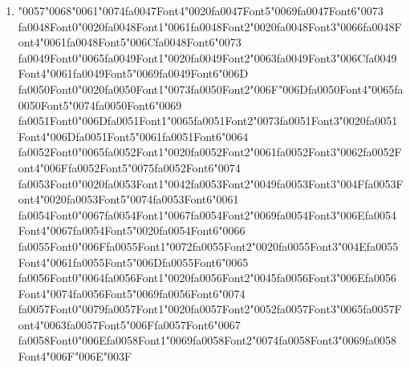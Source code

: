 \documentclass[11pt]{article}
\begin{document}
\begin{enumerate}[leftmargin=*]
  \item {\char"0057}{\char"0068}{\char"0061}{\char"0074}{\csname fa0047Font4\endcsname\char"0020}{\csname fa0047Font5\endcsname\char"0069}{\csname fa0047Font6\endcsname\char"0073} {\csname fa0048Font0\endcsname\char"0020}{\csname fa0048Font1\endcsname\char"0061}{\csname fa0048Font2\endcsname\char"0020}{\csname fa0048Font3\endcsname\char"0066}{\csname fa0048Font4\endcsname\char"0061}{\csname fa0048Font5\endcsname\char"006C}{\csname fa0048Font6\endcsname\char"0073} {\csname fa0049Font0\endcsname\char"0065}{\csname fa0049Font1\endcsname\char"0020}{\csname fa0049Font2\endcsname\char"0063}{\csname fa0049Font3\endcsname\char"006C}{\csname fa0049Font4\endcsname\char"0061}{\csname fa0049Font5\endcsname\char"0069}{\csname fa0049Font6\endcsname\char"006D} {\csname fa0050Font0\endcsname\char"0020}{\csname fa0050Font1\endcsname\char"0073}{\csname fa0050Font2\endcsname\char"006F}{\char"006D}{\csname fa0050Font4\endcsname\char"0065}{\csname fa0050Font5\endcsname\char"0074}{\csname fa0050Font6\endcsname\char"0069} {\csname fa0051Font0\endcsname\char"006D}{\csname fa0051Font1\endcsname\char"0065}{\csname fa0051Font2\endcsname\char"0073}{\csname fa0051Font3\endcsname\char"0020}{\csname fa0051Font4\endcsname\char"006D}{\csname fa0051Font5\endcsname\char"0061}{\csname fa0051Font6\endcsname\char"0064} {\csname fa0052Font0\endcsname\char"0065}{\csname fa0052Font1\endcsname\char"0020}{\csname fa0052Font2\endcsname\char"0061}{\csname fa0052Font3\endcsname\char"0062}{\csname fa0052Font4\endcsname\char"006F}{\csname fa0052Font5\endcsname\char"0075}{\csname fa0052Font6\endcsname\char"0074} {\csname fa0053Font0\endcsname\char"0020}{\csname fa0053Font1\endcsname\char"0042}{\csname fa0053Font2\endcsname\char"0049}{\csname fa0053Font3\endcsname\char"004F}{\csname fa0053Font4\endcsname\char"0020}{\csname fa0053Font5\endcsname\char"0074}{\csname fa0053Font6\endcsname\char"0061} {\csname fa0054Font0\endcsname\char"0067}{\csname fa0054Font1\endcsname\char"0067}{\csname fa0054Font2\endcsname\char"0069}{\csname fa0054Font3\endcsname\char"006E}{\csname fa0054Font4\endcsname\char"0067}{\csname fa0054Font5\endcsname\char"0020}{\csname fa0054Font6\endcsname\char"0066} {\csname fa0055Font0\endcsname\char"006F}{\csname fa0055Font1\endcsname\char"0072}{\csname fa0055Font2\endcsname\char"0020}{\csname fa0055Font3\endcsname\char"004E}{\csname fa0055Font4\endcsname\char"0061}{\csname fa0055Font5\endcsname\char"006D}{\csname fa0055Font6\endcsname\char"0065} {\csname fa0056Font0\endcsname\char"0064}{\csname fa0056Font1\endcsname\char"0020}{\csname fa0056Font2\endcsname\char"0045}{\csname fa0056Font3\endcsname\char"006E}{\csname fa0056Font4\endcsname\char"0074}{\csname fa0056Font5\endcsname\char"0069}{\csname fa0056Font6\endcsname\char"0074} {\csname fa0057Font0\endcsname\char"0079}{\csname fa0057Font1\endcsname\char"0020}{\csname fa0057Font2\endcsname\char"0052}{\csname fa0057Font3\endcsname\char"0065}{\csname fa0057Font4\endcsname\char"0063}{\csname fa0057Font5\endcsname\char"006F}{\csname fa0057Font6\endcsname\char"0067} {\csname fa0058Font0\endcsname\char"006E}{\csname fa0058Font1\endcsname\char"0069}{\csname fa0058Font2\endcsname\char"0074}{\csname fa0058Font3\endcsname\char"0069}{\csname fa0058Font4\endcsname\char"006F}{\char"006E}{\char"003F}

\end{enumerate}
\end{document}
